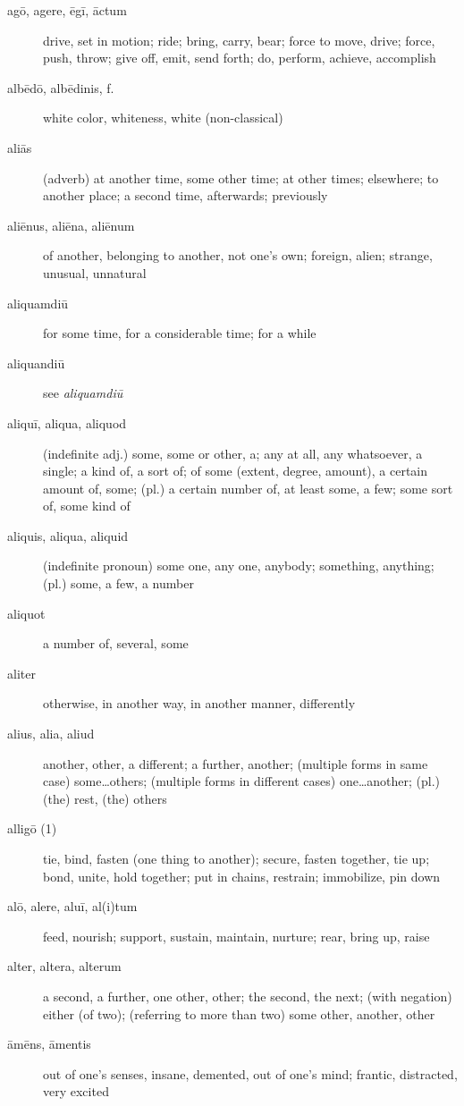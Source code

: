 \begin{description}
    \item[agō, agere, ēgī, āctum] \marginnote{*}drive, set in motion; ride; bring, carry, bear; force to move, drive; force, push, throw; give off, emit, send forth; do, perform, achieve, accomplish
    \item[albēdō, albēdinis, f.] white color, whiteness, white (non-classical)
    \item[aliās] (adverb) at another time, some other time; at other times; elsewhere; to another place; a second time, afterwards; previously
    \item[aliēnus, aliēna, aliēnum] \marginnote{*}of another, belonging to another, not one's own; foreign, alien; strange, unusual, unnatural
    \item[aliquamdiū] for some time, for a considerable time; for a while
    \item[aliquandiū] see \textit{aliquamdiū}
    \item[aliquī, aliqua, aliquod] \marginnote{*}(indefinite adj.) some, some or other, a; any at all, any whatsoever, a single; a kind of, a sort of; of some (extent, degree, amount), a certain amount of, some; (pl.) a certain number of, at least some, a few; some sort of, some kind of
    \item[aliquis, aliqua, aliquid] \marginnote{*}(indefinite pronoun) some one, any one, anybody; something, anything; (pl.) some, a few, a number
    \item[aliquot] a number of, several, some
    \item[aliter] \marginnote{*}otherwise, in another way, in another manner, differently
    \item[alius, alia, aliud] \marginnote{*}another, other, a different; a further, another; (multiple forms in same case) some\dots others; (multiple forms in different cases) one\dots another; (pl.) (the) rest, (the) others
    \item[alligō (1)] tie, bind, fasten (one thing to another); secure, fasten together, tie up; bond, unite, hold together; put in chains, restrain; immobilize, pin down
    \item[alō, alere, aluī, al(i)tum] \marginnote{*}feed, nourish; support, sustain, maintain, nurture; rear, bring up, raise
    \item[alter, altera, alterum] \marginnote{*}a second, a further, one other, other; the second, the next; (with negation) either (of two); (referring to more than two) some other, another, other
    \item[āmēns, āmentis] out of one's senses, insane, demented, out of one's mind; frantic, distracted, very excited

\end{description}
